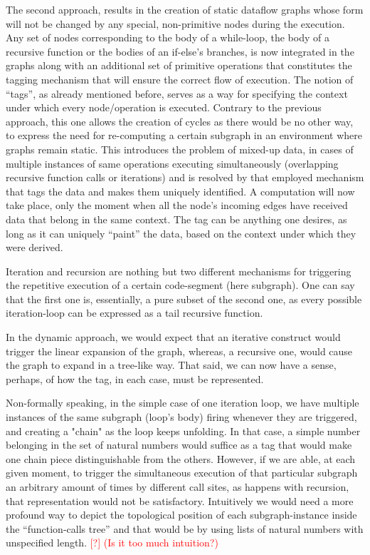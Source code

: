 \documentclass[ack,preface]{dithesis}
\begin{document}
The second approach, results in the creation of static dataflow graphs whose form will not be changed by any special, non-primitive nodes during the execution. Any set of nodes corresponding to the body of a while-loop, the body of a recursive function or the bodies of an if-else’s branches, is now integrated in the graphs along with an additional set of primitive operations that constitutes the tagging mechanism that will ensure the correct flow of execution. The notion of “tags”, as already mentioned before, serves as a way for specifying the context under which every node/operation is executed. Contrary to the previous approach, this one allows the creation of cycles as there would be no other way, to express the need for re-computing a certain subgraph in an environment where graphs remain static. This introduces the problem of mixed-up data, in cases of multiple instances of same operations executing simultaneously (overlapping recursive function calls or iterations) and is resolved by that employed mechanism that tags the data and makes them uniquely identified. A computation will now take place, only the moment when all the node’s incoming edges have received data that belong in the same context. The tag can be anything one desires, as long as it can uniquely “paint” the data, based on the context under which they were derived.

Iteration and recursion are nothing but two different mechanisms for triggering the repetitive execution of a certain code-segment (here subgraph). One can say that the first one is, essentially, a pure subset of the second one, as every possible iteration-loop can be expressed as a tail recursive function. 

In the dynamic approach, we would expect that an iterative construct would trigger the linear expansion of the graph, whereas, a recursive one, would cause the graph to expand in a tree-like way. That said, we can now have a sense, perhaps, of how the tag, in each case, must be represented. 

Non-formally speaking, in the simple case of one iteration loop, we have multiple instances of the same subgraph (loop’s body) firing whenever they are triggered, and creating a "chain" as the loop keeps unfolding. In that case, a simple number belonging in the set of natural numbers would suffice as a tag that would make one chain piece distinguishable from the others. However, if we are able, at each given moment, to trigger the simultaneous execution of that particular subgraph an arbitrary amount of times by different call sites, as happens with recursion, that representation would not be satisfactory. Intuitively we would need a more profound way to depict the topological position of each subgraph-instance inside the “function-calls tree” and that would be by using lists of natural numbers with unspecified length. \textcolor{red}{[?] (Is it too much intuition?)}
\end{document}
